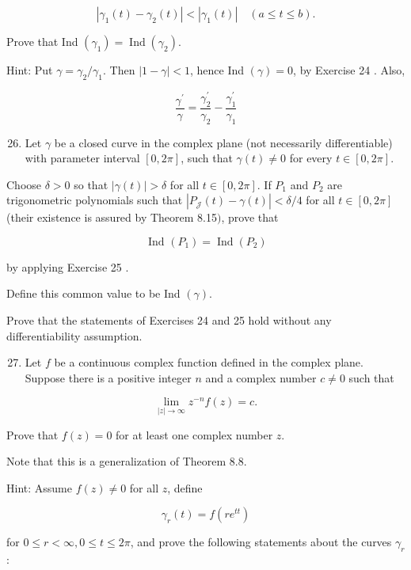 \documentclass[10pt]{article}
\begin{document}
$$
\left|\gamma_{1}(t)-\gamma_{2}(t)\right|<\left|\gamma_{1}(t)\right| \quad(a \leq t \leq b) .
$$

Prove that Ind $\left(\gamma_{1}\right)=\operatorname{Ind}\left(\gamma_{2}\right)$.

Hint: Put $\gamma=\gamma_{2} / \gamma_{1}$. Then $|1-\gamma|<1$, hence Ind $(\gamma)=0$, by Exercise 24 . Also,

$$
\frac{\gamma^{\prime}}{\gamma}=\frac{\gamma_{2}^{\prime}}{\gamma_{2}}-\frac{\gamma_{1}^{\prime}}{\gamma_{1}}
$$

\begin{enumerate}
  \setcounter{enumi}{25}
  \item Let $\gamma$ be a closed curve in the complex plane (not necessarily differentiable) with parameter interval $[0,2 \pi]$, such that $\gamma(t) \neq 0$ for every $t \in[0,2 \pi]$.
\end{enumerate}

Choose $\delta>0$ so that $|\gamma(t)|>\delta$ for all $t \in[0,2 \pi]$. If $P_{1}$ and $P_{2}$ are trigonometric polynomials such that $\left|P_{\mathcal{J}}(t)-\gamma(t)\right|<\delta / 4$ for all $t \in[0,2 \pi]$ (their existence is assured by Theorem 8.15$)$, prove that

$$
\text { Ind }\left(P_{1}\right)=\operatorname{Ind}\left(P_{2}\right)
$$

by applying Exercise 25 .

Define this common value to be Ind $(\gamma)$.

Prove that the statements of Exercises 24 and 25 hold without any differentiability assumption.

\begin{enumerate}
  \setcounter{enumi}{26}
  \item Let $f$ be a continuous complex function defined in the complex plane. Suppose there is a positive integer $n$ and a complex number $c \neq 0$ such that
\end{enumerate}

$$
\lim _{|z| \rightarrow \infty} z^{-n} f(z)=c .
$$

Prove that $f(z)=0$ for at least one complex number $z$.

Note that this is a generalization of Theorem 8.8.

Hint: Assume $f(z) \neq 0$ for all $z$, define

$$
\gamma_{r}(t)=f\left(r e^{t t}\right)
$$

for $0 \leq r<\infty, 0 \leq t \leq 2 \pi$, and prove the following statements about the curves $\gamma_{r}$ :
\end{document}
